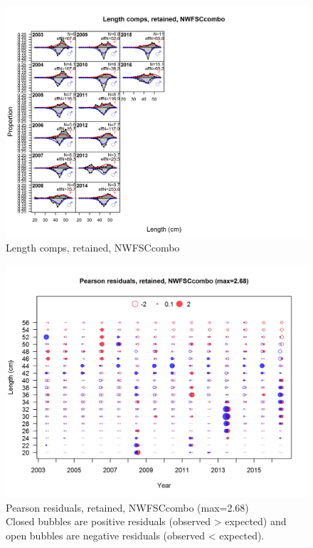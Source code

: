 \documentclass[12pt,]{article}
\begin{document}
\begin{figure}[htbp]
\centering
\includegraphics{./r4ss/plots_mod1/comp_lenfit_flt6mkt2.png}
\caption{Length comps, retained, NWFSCcombo
\label{fig:mod1_26_comp_lenfit_flt6mkt2}}
\end{figure}

\begin{figure}[htbp]
\centering
\includegraphics{./r4ss/plots_mod1/comp_lenfit_residsflt6mkt2.png}
\caption{Pearson residuals, retained, NWFSCcombo (max=2.68)\\
Closed bubbles are positive residuals (observed \textgreater{} expected)
and open bubbles are negative residuals (observed \textless{} expected).
\label{fig:mod1_27_comp_lenfit_residsflt6mkt2}}
\end{figure}
\end{document}
